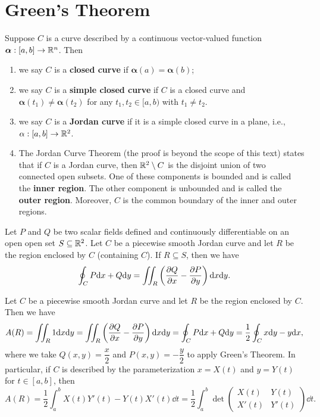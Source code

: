 \section{Green's Theorem}
\begin{definitionenv}
    Suppose $C$ is a curve described by a continuous vector-valued function $\bm \alpha: [a,b] \to \mathbb{R}^n$. Then
    \begin{enumerate}[label=(\arabic*)]
        \item we say $C$ is a \textbf{closed curve} if $\bm \alpha(a) = \bm \alpha(b)$;
        \item we say $C$ is a \textbf{simple closed curve} if $C$ is a closed curve and $\bm \alpha(t_1) \neq \bm \alpha(t_2)$ for any $t_1, t_2 \in [a,b)$ with $t_1 \neq t_2$.
        \item we say $C$ is a \textbf{Jordan curve} if it is a simple closed curve in a plane, i.e., $\alpha : [a,b] \to \mathbb{R}^2$.
        \item The Jordan Curve Theorem (the proof is beyond the scope of this text) states that if $C$ is a Jordan curve, then $\mathbb{R}^2 \setminus C$ is the disjoint union of two connected open subsets. One of these components is bounded and is called the \textbf{inner region}. The other component is unbounded and is called the \textbf{outer region}. Moreover, $C$ is the common boundary of the inner and outer regions.
    \end{enumerate}
\end{definitionenv}
\begin{theoremenv}
    Let $P$ and $Q$ be two scalar fields defined and continuously differentiable on an open open set $S\subseteq \mathbb{R}^2$. Let $C$ be a piecewise smooth Jordan curve and let $R$ be the region enclosed by $C$ (containing $C$). If $R \subseteq S$, then we have
    $$ \oint_C P \dd x + Q \dd y = \iint_R \left( \pdv{Q}{x} - \pdv{P}{y} \right) \dd x \dd y. $$
\end{theoremenv}
\begin{exampleenv}
    Let $C$ be a piecewise smooth Jordan curve and let $R$ be the region enclosed by $C$. Then we have
    \[
    A(R) = \iint_R 1 \dd x \dd y = \iint_R \left( \pdv{Q}{x} - \pdv{P}{y} \right) \dd x \dd y = \oint_C P \dd x + Q \dd y = \frac12 \oint_C x \dd y - y \dd x,
    \]
    where we take $Q(x,y) =  \dfrac{x}{2}$ and $P(x,y) = -\dfrac{y}{2}$ to apply Green's Theorem. In particular, if $C$ is described by the parameterization $x = X(t)$ and $y = Y(t)$ for $t \in [a,b]$, then
    \[
    A(R) = \frac12 \int_a^b X(t) Y'(t) - Y(t) X'(t) \dd t = \frac12 \int_a^b \det \begin{pmatrix} X(t) & Y(t)\\ X'(t) & Y'(t) \end{pmatrix} \dd t.
    \]
\end{exampleenv}


